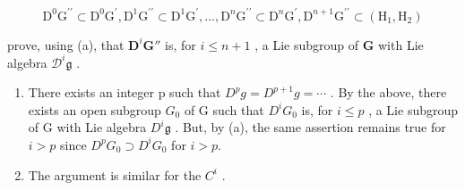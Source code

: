 \[
\mathrm{D} ^ {0} \mathrm{G} ^ {\prime \prime} \subset \mathrm{D} ^ {0} \mathrm{G} ^ {\prime}, \mathrm{D} ^ {1} \mathrm{G} ^ {\prime \prime} \subset \mathrm{D} ^ {1} \mathrm{G} ^ {\prime}, \dots , \mathrm{D} ^ {n} \mathrm{G} ^ {\prime \prime} \subset \mathrm{D} ^ {n} \mathrm{G} ^ {\prime}, \mathrm{D} ^ {n + 1} \mathrm{G} ^ {\prime \prime} \subset (\mathrm{H} _ {1}, \mathrm{H} _ {2})
\]

prove, using (a), that \(\mathbf{D}^i\mathbf{G}''\) is, for \(i\leqslant n + 1\) , a Lie subgroup of \(\mathbf{G}\) with Lie algebra \(\mathcal{D}^i\mathfrak{g}\) .

\begin{enumerate}
\def\labelenumi{(\alph{enumi})}
\setcounter{enumi}{2}
\item
  There exists an integer p such that \(D^{p}g = D^{p+1}g = \cdots\) . By the above, there exists an open subgroup \(G_{0}\) of G such that \(D^{i}G_{0}\) is, for \(i \leqslant p\) , a Lie subgroup of G with Lie algebra \(D^{i}\mathfrak{g}\) . But, by (a), the same assertion remains true for \(i > p\) since \(D^{p}G_{0} \supset D^{i}G_{0}\) for \(i > p\).
\item
  The argument is similar for the \(C^{i}\) .
\end{enumerate}

